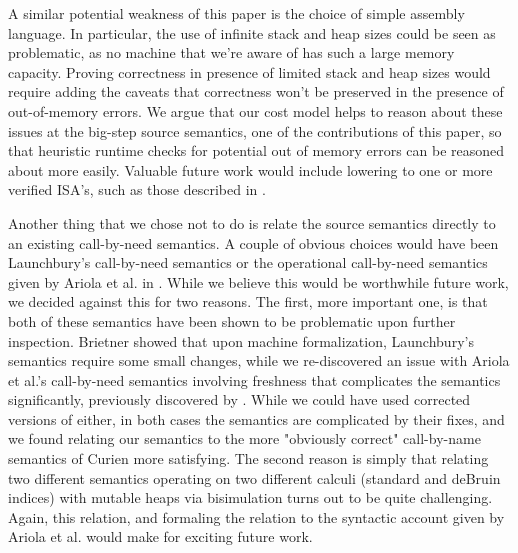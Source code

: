 A similar potential weakness of this paper is the choice of simple assembly
language.  In particular, the use of infinite stack and heap sizes could be
seen as problematic, as no machine that we're aware of has such a large memory
capacity. Proving correctness in presence of limited stack and heap sizes would
require adding the caveats that correctness won't be preserved in the presence
of out-of-memory errors. We argue that our cost model helps to reason about
these issues at the big-step source semantics, one of the contributions of this
paper, so that heuristic runtime checks for potential out of memory errors can
be reasoned about more easily. Valuable future work would include lowering to
one or more verified ISA's, such as those described in \cite{compcert}. 

Another thing that we chose not to do is relate the source semantics directly to an
existing call-by-need semantics. A couple of obvious choices would have been
Launchbury's call-by-need semantics \cite{launchbury} or the operational
call-by-need semantics given by Ariola et al. in \cite{ariola}. While we believe this
would be worthwhile future work, we decided against this for two reasons. The
first, more important one, is that both of these semantics have been shown to
be problematic upon further inspection. Brietner showed that upon machine formalization, 
Launchbury's semantics require some small changes, while we re-discovered an issue with
Ariola et al.'s call-by-need semantics involving freshness that complicates the
semantics significantly, previously discovered by \cite{?}. While we could have used
corrected versions of either, in both cases the semantics are complicated by
their fixes, and we found relating our semantics to the more "obviously
correct" call-by-name semantics of Curien more satisfying. The second reason is simply
that relating two different semantics operating on two different calculi
(standard and deBruin indices) with mutable heaps via bisimulation turns out to
be quite challenging. Again, this relation, and formaling the relation to the
syntactic account given by Ariola et al. would make for exciting future work.



